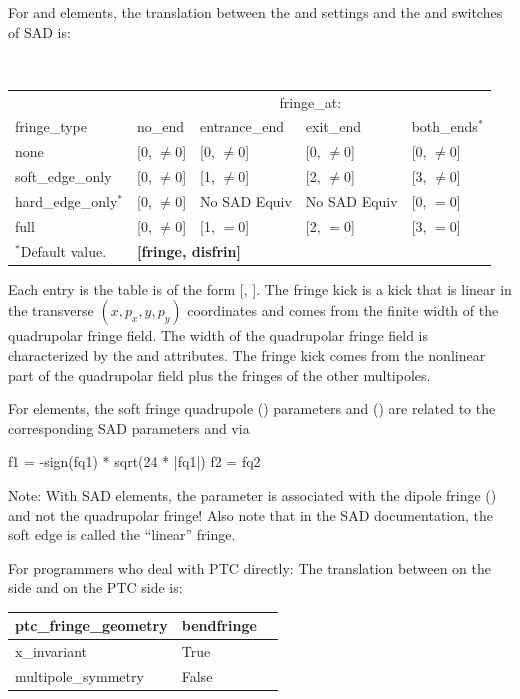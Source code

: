 {For  and  elements, the translation between the 
and  settings and the  and  switches of SAD is:
\newline\hspace*{0.1in}
{{ \tt
\begin{tabular}{lllll} 
                       & \multicolumn{4}{c}{fringe_at:}                               \\
  fringe_type          & no_end       & entrance_end   & exit_end     & both_ends$^*$ \\ \midrule
  none                 & [0, $\ne 0$] & [0, $\ne 0$]   & [0, $\ne 0$] & [0, $\ne 0$]  \\
  soft_edge_only       & [0, $\ne 0$] & [1, $\ne 0$]   & [2, $\ne 0$] & [3, $\ne 0$]  \\
  hard_edge_only$^*$   & [0, $\ne 0$] & No SAD Equiv   & No SAD Equiv & [0, $= 0$]    \\
  full                 & [0, $\ne 0$] & [1, $= 0$]     & [2, $= 0$]   & [3, $= 0$]    \\ 
  \bottomrule
  $^*$Default value.   & \multicolumn{4}{l}{\textbf{[fringe, disfrin]}} \\
\end{tabular}
\hfill\vspace*{0.1in}
}\newline}
Each entry is the table is of the form [, ]. The  fringe
kick is a kick that is linear in the transverse $(x, p_x, y, p_y)$ coordinates and comes from the
finite width of the quadrupolar fringe field. The width of the quadrupolar fringe field is
characterized by the  and  attributes. The  fringe kick comes
from the nonlinear part of the quadrupolar field plus the fringes of the other multipoles.

For  elements, the soft fringe quadrupole () parameters  and
 () are related to the corresponding SAD parameters  and  via
\begin{example}
  f1 = -sign(fq1) * sqrt(24 * |fq1|)
  f2 = fq2
\end{example}
Note: With SAD  elements, the  parameter is associated with the dipole fringe
() and not the quadrupolar fringe!
Also note that in the SAD documentation, the soft edge is called the ``linear'' fringe.

For programmers who deal with PTC directly: The translation between  on the
\bmad side and  on the PTC side is:
\newline\hspace*{0.1in}
{
\begin{tabular}{lll} \toprule 
  ptc_fringe_geometry     & bendfringe \\ \midrule
  x_invariant             & True       \\
  multipole_symmetry      & False      \\ 
  \bottomrule
\end{tabular}
}

}

